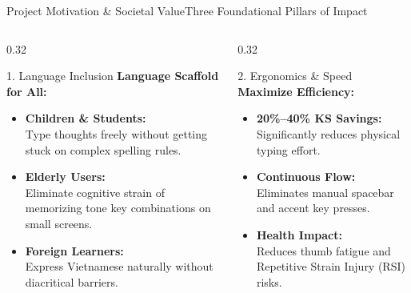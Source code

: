 \documentclass[aspectratio=169,10pt]{beamer}
\begin{document}
\begin{frame}{Project Motivation \& Societal Value}{Three Foundational Pillars of Impact}
  \begin{columns}[T]
    \begin{column}{0.32\textwidth}
      \begin{block}{1. Language Inclusion}
        \textbf{\footnotesize Language Scaffold for All:}
        \begin{itemize}\setlength{\itemsep}{2.5pt}\scriptsize
          \item \textbf{Children \& Students:}\\
            Type thoughts freely without getting stuck on complex spelling rules.
          \item \textbf{Elderly Users:}\\
            Eliminate cognitive strain of memorizing tone key combinations on small screens.
          \item \textbf{Foreign Learners:}\\
            Express Vietnamese naturally without diacritical barriers.
        \end{itemize}
      \end{block}
    \end{column}

    \begin{column}{0.32\textwidth}
      \begin{block}{2. Ergonomics \& Speed}
        \textbf{\footnotesize Maximize Efficiency:}
        \begin{itemize}\setlength{\itemsep}{2.5pt}\scriptsize
          \item \textbf{20\%--40\% KS Savings:}\\
            Significantly reduces physical typing effort.
          \item \textbf{Continuous Flow:}\\
            Eliminates manual spacebar and accent key presses.
          \item \textbf{Health Impact:}\\
            Reduces thumb fatigue and Repetitive Strain Injury (RSI) risks.
        \end{itemize}
      \end{block}
    \end{column}


\end{columns}
\end{frame}
\end{document}
